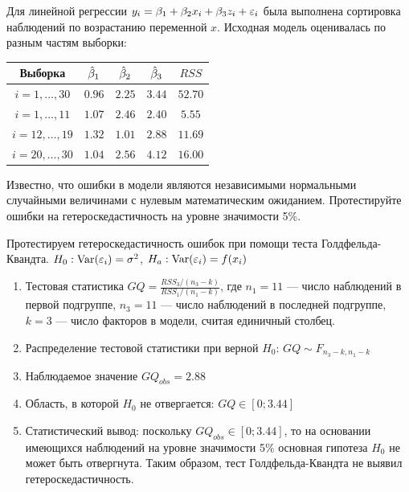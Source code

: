 \begin{problem}
Для линейной регрессии $y_i = \beta_1 + \beta_2 x_i + \beta_3 z_i + \varepsilon_i$ была
выполнена сортировка наблюдений по возрастанию переменной $x$. Исходная модель оценивалась по разным частям выборки:

\begin{tabular}{c|cccc}
\toprule
Выборка & $\hat{\beta}_1$ & $\hat{\beta}_2$ & $\hat{\beta}_3$ & $RSS$ \\
\midrule
$i=1,\ldots, 30$ & $0.96$ & $2.25$ & $3.44$ & $52.70$ \\
$i=1,\ldots, 11$ & $1.07$ & $2.46$ & $2.40$ & $5.55$ \\
$i=12,\ldots, 19$ & $1.32$ & $1.01$ & $2.88$ & $11.69$ \\
$i=20,\ldots, 30$ & $1.04$ & $2.56$ & $4.12$ & $16.00$ \\
\bottomrule
\end{tabular}

Известно, что ошибки в модели являются независимыми нормальными случайными величинами с нулевым математическим ожиданием. Протестируйте
ошибки на гетероскедастичность на уровне значимости 5\%.


\begin{sol}
Протестируем гетероскедастичность ошибок при помощи теста Голдфельда-
Квандта. $H_0: \operatorname{Var}(\varepsilon_i)=\sigma^2$, $H_a: \operatorname{Var}(\varepsilon_i)=f(x_i)$

\begin{enumerate}
\item Тестовая статистика $GQ=\frac{RSS_3/(n_3-k)}{RSS_1/(n_1-k)}$, где $n_1=11$ — число наблюдений в первой подгруппе, $n_3=11$ — число наблюдений в
последней подгруппе, $k=3$ — число факторов в модели, считая единичный столбец.
\item Распределение тестовой статистики при верной $H_0$: $GQ\sim F_{n_3-k,n_1-k}$
\item Наблюдаемое значение $GQ_{obs}=2.88$
\item Область, в которой $H_0$ не отвергается: $GQ\in [0;3.44]$
\item Статистический вывод: поскольку $GQ_{obs} \in [0;3.44]$, то на основании имеющихся наблюдений на уровне значимости 5\% основная гипотеза $H_0$ не может быть отвергнута. Таким образом, тест Голдфельда-Квандта не выявил гетероскедастичность.
\end{enumerate}
\end{sol}
\end{problem}



